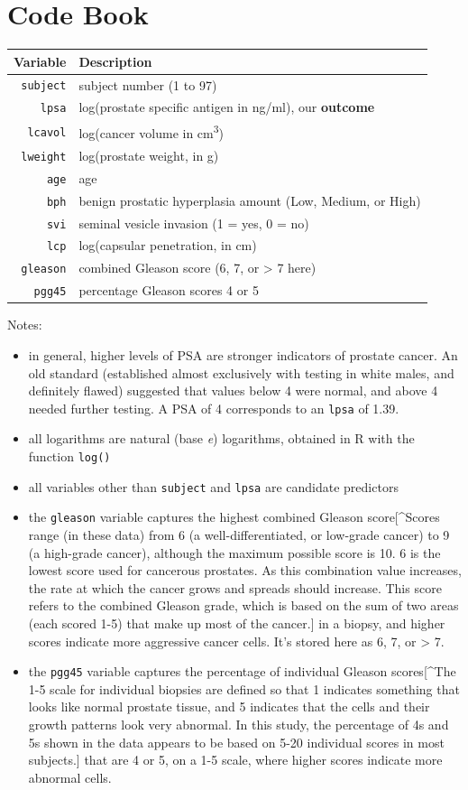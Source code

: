 \documentclass[]{book}
\providecommand{\tightlist}{%
  \setlength{\itemsep}{0pt}\setlength{\parskip}{0pt}}
\theoremstyle{definition}
\theoremstyle{definition}
\theoremstyle{definition}
\theoremstyle{remark}
\begin{document}
\section{Code Book}\label{code-book}

\begin{longtable}[]{@{}rl@{}}
\toprule
Variable & Description\tabularnewline
\midrule
\endhead
\texttt{subject} & subject number (1 to 97)\tabularnewline
\texttt{lpsa} & log(prostate specific antigen in ng/ml), our
\textbf{outcome}\tabularnewline
\texttt{lcavol} & log(cancer volume in
cm\textsuperscript{3})\tabularnewline
\texttt{lweight} & log(prostate weight, in g)\tabularnewline
\texttt{age} & age\tabularnewline
\texttt{bph} & benign prostatic hyperplasia amount (Low, Medium, or
High)\tabularnewline
\texttt{svi} & seminal vesicle invasion (1 = yes, 0 = no)\tabularnewline
\texttt{lcp} & log(capsular penetration, in cm)\tabularnewline
\texttt{gleason} & combined Gleason score (6, 7, or \textgreater{} 7
here)\tabularnewline
\texttt{pgg45} & percentage Gleason scores 4 or 5\tabularnewline
\bottomrule
\end{longtable}

Notes:

\begin{itemize}
\tightlist
\item
  in general, higher levels of PSA are stronger indicators of prostate
  cancer. An old standard (established almost exclusively with testing
  in white males, and definitely flawed) suggested that values below 4
  were normal, and above 4 needed further testing. A PSA of 4
  corresponds to an \texttt{lpsa} of 1.39.
\item
  all logarithms are natural (base \emph{e}) logarithms, obtained in R
  with the function \texttt{log()}
\item
  all variables other than \texttt{subject} and \texttt{lpsa} are
  candidate predictors
\item
  the \texttt{gleason} variable captures the highest combined Gleason
  score{[}\^{}Scores range (in these data) from 6 (a
  well-differentiated, or low-grade cancer) to 9 (a high-grade cancer),
  although the maximum possible score is 10. 6 is the lowest score used
  for cancerous prostates. As this combination value increases, the rate
  at which the cancer grows and spreads should increase. This score
  refers to the combined Gleason grade, which is based on the sum of two
  areas (each scored 1-5) that make up most of the cancer.{]} in a
  biopsy, and higher scores indicate more aggressive cancer cells. It's
  stored here as 6, 7, or \textgreater{} 7.
\item
  the \texttt{pgg45} variable captures the percentage of individual
  Gleason scores{[}\^{}The 1-5 scale for individual biopsies are defined
  so that 1 indicates something that looks like normal prostate tissue,
  and 5 indicates that the cells and their growth patterns look very
  abnormal. In this study, the percentage of 4s and 5s shown in the data
  appears to be based on 5-20 individual scores in most subjects.{]}
  that are 4 or 5, on a 1-5 scale, where higher scores indicate more
  abnormal cells.
\end{itemize}
\end{document}
